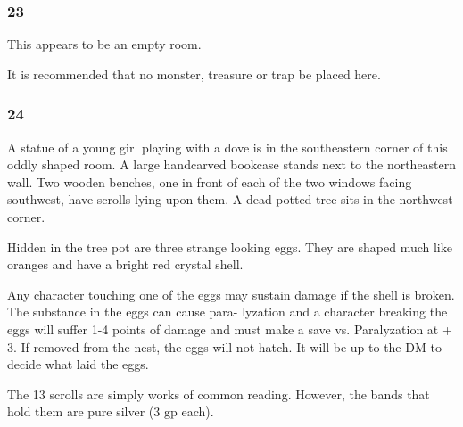 \documentclass[palace_of_the_silver_princess]{subfiles}
\begin{document}
\subsubsection{23}
\begin{quotebox}
    This appears to be an empty room.
\end{quotebox}

It is recommended that no monster, treasure or trap be placed here.

\subsubsection{24}
\begin{quotebox}
    A statue of a young girl playing with a dove is in the southeastern
    corner of this oddly shaped room. A large handcarved bookcase stands
    next to the northeastern wall. Two wooden benches, one in front of
    each of the two windows facing southwest, have scrolls lying upon
    them. A dead potted tree sits in the northwest corner.
\end{quotebox}

Hidden in the tree pot are three strange looking eggs. They are shaped
much like oranges and have a bright red crystal shell.

Any character touching one of the eggs may sustain damage if the shell
is broken. The substance in the eggs can cause para- lyzation and a
character breaking the eggs will suffer 1-4 points of damage and must
make a save vs. Paralyzation at + 3. If removed from the nest, the eggs
will not hatch. It will be up to the DM to decide what laid the eggs.

The 13 scrolls are simply works of common reading. However, the bands
that hold them are pure silver (3 gp each).
\end{document}
